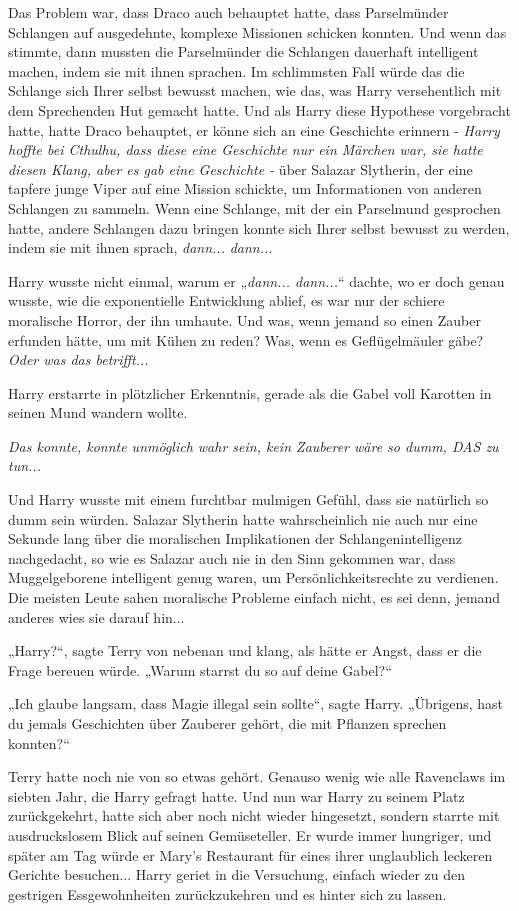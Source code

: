 {Das Problem war, dass Draco auch behauptet hatte, dass Parselmünder Schlangen auf ausgedehnte, komplexe Missionen schicken konnten. Und wenn das stimmte, dann mussten die Parselmünder die Schlangen dauerhaft intelligent machen, indem sie mit ihnen sprachen. Im schlimmsten Fall würde das die Schlange sich Ihrer selbst bewusst machen, wie das, was Harry versehentlich mit dem Sprechenden Hut gemacht hatte. Und als Harry diese Hypothese vorgebracht hatte, hatte Draco behauptet, er könne sich an eine Geschichte erinnern - \emph{Harry hoffte bei Cthulhu, dass diese eine Geschichte nur ein Märchen war, sie hatte diesen Klang, aber es gab eine Geschichte -} über Salazar Slytherin, der eine tapfere junge Viper auf eine Mission schickte, um Informationen von anderen Schlangen zu sammeln. Wenn eine Schlange, mit der ein Parselmund gesprochen hatte, andere Schlangen dazu bringen konnte sich Ihrer selbst bewusst zu werden, indem sie mit ihnen sprach, \emph{dann...} \emph{dann...}

Harry wusste nicht einmal, warum er „\emph{dann... dann...}“ dachte, wo er doch genau wusste, wie die exponentielle Entwicklung ablief, es war nur der schiere moralische Horror, der ihn umhaute. Und was, wenn jemand so einen Zauber erfunden hätte, um mit Kühen zu reden? Was, wenn es Geflügelmäuler gäbe? \emph{Oder was das betrifft...}

Harry erstarrte in plötzlicher Erkenntnis, gerade als die Gabel voll Karotten in seinen Mund wandern wollte.

\emph{Das konnte, konnte unmöglich wahr sein, kein Zauberer wäre so dumm, DAS zu tun...}

Und Harry wusste mit einem furchtbar mulmigen Gefühl, dass sie natürlich so dumm sein würden. Salazar Slytherin hatte wahrscheinlich nie auch nur eine Sekunde lang über die moralischen Implikationen der Schlangenintelligenz nachgedacht, so wie es Salazar auch nie in den Sinn gekommen war, dass Muggelgeborene intelligent genug waren, um Persönlichkeitsrechte zu verdienen. Die meisten Leute sahen moralische Probleme einfach nicht, es sei denn, jemand anderes wies sie darauf hin...

„Harry?“, sagte Terry von nebenan und klang, als hätte er Angst, dass er die Frage bereuen würde. „Warum starrst du so auf deine Gabel?“

„Ich glaube langsam, dass Magie illegal sein sollte“, sagte Harry. „Übrigens, hast du jemals Geschichten über Zauberer gehört, die mit Pflanzen sprechen konnten?“

Terry hatte noch nie von so etwas gehört. Genauso wenig wie alle Ravenclaws im siebten Jahr, die Harry gefragt hatte. Und nun war Harry zu seinem Platz zurückgekehrt, hatte sich aber noch nicht wieder hingesetzt, sondern starrte mit ausdruckslosem Blick auf seinen Gemüseteller. Er wurde immer hungriger, und später am Tag würde er Mary's Restaurant für eines ihrer unglaublich leckeren Gerichte besuchen... Harry geriet in die Versuchung, einfach wieder zu den gestrigen Essgewohnheiten zurückzukehren und es hinter sich zu lassen.

}
